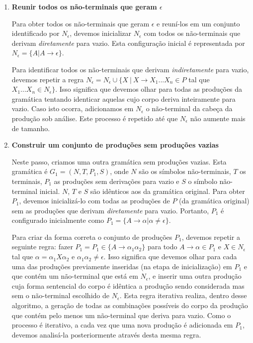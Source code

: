 \documentclass{compiladores}
\renewcommand{\flecha}{\rightarrow}
\begin{document}
\begin{enumerate}
\item {\bf Reunir todos os não-terminais que geram $\epsilon$}

  Para obter todos os não-terminais que geram $\epsilon$ e reuní-los
  em um conjunto identificado por $N_\epsilon$, devemos inicializar
  $N_\epsilon$ com todos os não-terminais que derivam
  \emph{diretamente} para vazio. Esta configuração inicial é
  representada por $N_\epsilon = \{ A \vert A \flecha \epsilon \}$.

  Para identificar todos os não-terminais que derivam
  \emph{indiretamente} para vazio, devemos repetir a regra $N_\epsilon
  = N_\epsilon \cup \{ X\ |\ X \rightarrow X_1...X_n \in P$ tal que
  $X_1...X_n \in N_\epsilon \}$. Isso significa que devemos olhar para
  todas as produções da gramática tentando identicar aquelas cujo
  corpo deriva inteiramente para vazio. Caso isto ocorra, adicionamos
  em $N_\epsilon$ o não-terminal da cabeça da produção sob
  análise. Este processo é repetido até que $N_{\epsilon}$ não aumente
  mais de tamanho.

\item {\bf Construir um conjunto de produções sem produções vazias}

  Neste passo, criamos uma outra gramática sem produções vazias. Esta
  gramática é $G_1 = (N, T, P_1, S)$, onde $N$ são os símbolos
  não-terminais, $T$ os terminais, $P_1$ as produções sem derivações
  para vazio e $S$ o símbolo não-terminal inicial. $N$, $T$ e $S$ são
  idênticos aos da gramática original. Para obter $P_1$, devemos
  inicializá-lo com todas as produções de $P$ (da gramática original)
  sem as produções que derivam \emph{diretamente} para
  vazio. Portanto, $P_1$ é configurado inicialmente como $P_1 = \{ A
  \flecha \alpha \vert \alpha \neq \epsilon \}$.

  Para criar da forma correta o conjunto de produções $P_1$, devemos
  repetir a seguinte regra: fazer $P_1 = P_1 \in \{ A \rightarrow
  \alpha_1\alpha_2 \}$ para todo $A \rightarrow \alpha \in P_1$ e $X
  \in N_\epsilon$ tal que $\alpha = \alpha_1X\alpha_2$ e
  $\alpha_1\alpha_2 \neq \epsilon$. Isso significa que devemos olhar
  para cada uma das produções previamente inseridas (na etapa de
  inicialização) em $P_1$ e que contém um não-terminal que está em
  $N_\epsilon$, e inserir uma outra produção cuja forma sentencial do
  corpo é idêntica a produção sendo considerada mas sem o não-terminal
  escolhido de $N_\epsilon$. Esta regra iterativa realiza, dentro
  desse algoritmo, a geração de todas as combinações possíveis do
  corpo da produção que contém pelo menos um não-terminal que deriva
  para vazio. Como o processo é iterativo, a cada vez que uma nova
  produção é adicionada em $P_1$, devemos analisá-la posteriormente
  através desta mesma regra.


\end{enumerate}
\end{document}
